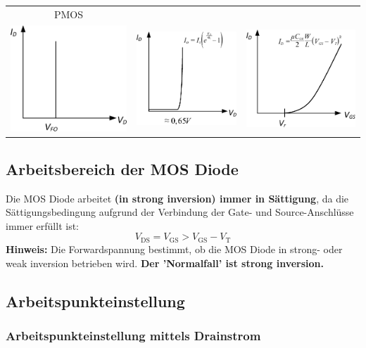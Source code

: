 \begin{tabularx}{\columnwidth}{@{}c c c c@{}}
{        PMOS} \\
    \includegraphics[width=.3\columnwidth]{images/04_diode_ideal_kennlinie.pdf} & 
    \includegraphics[width=.3\columnwidth]{images/04_diode_real_kennlinie.pdf} & 
    \multicolumn{2}{c}{\includegraphics[width=.3\columnwidth]{images/04_diode_mos_kennlinie.pdf}} \\ 
\end{tabularx}


\subsection{Arbeitsbereich der MOS Diode}

Die MOS Diode arbeitet \textbf{(in strong inversion) immer in Sättigung}, da die Sättigungsbedingung aufgrund der Verbindung der Gate- und Source-Anschlüsse immer erfüllt ist:
\[
    V_\text{DS} = V_\text{GS} > V_\text{GS} - V_\text{T}
\]
\textbf{Hinweis:} Die Forwardspannung bestimmt, ob die MOS Diode in strong- oder weak inversion betrieben wird.
\textbf{Der 'Normalfall' ist strong inversion.}


\subsection{Arbeitspunkteinstellung}

\subsubsection{Arbeitspunkteinstellung mittels Drainstrom}

